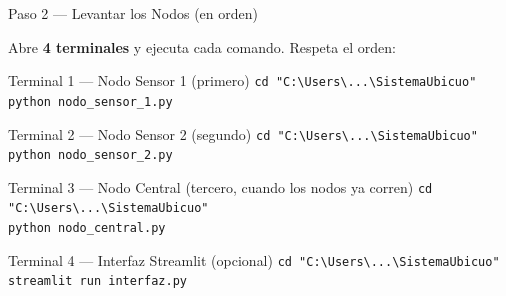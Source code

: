 \documentclass[aspectratio=169]{beamer}
\begin{document}
\begin{frame}{Paso 2 --- Levantar los Nodos (en orden)}

Abre \textbf{4 terminales} y ejecuta cada comando. Respeta el orden:

\vspace{0.3em}
\begin{exampleblock}{Terminal 1 --- Nodo Sensor 1 \quad (primero)}
\texttt{cd "C:\textbackslash{}Users\textbackslash{}...\textbackslash{}SistemaUbicuo"}\\
\texttt{python nodo\_sensor\_1.py}
\end{exampleblock}

\begin{exampleblock}{Terminal 2 --- Nodo Sensor 2 \quad (segundo)}
\texttt{cd "C:\textbackslash{}Users\textbackslash{}...\textbackslash{}SistemaUbicuo"}\\
\texttt{python nodo\_sensor\_2.py}
\end{exampleblock}

\begin{block}{Terminal 3 --- Nodo Central \quad (tercero, cuando los nodos ya corren)}
\texttt{cd "C:\textbackslash{}Users\textbackslash{}...\textbackslash{}SistemaUbicuo"}\\
\texttt{python nodo\_central.py}
\end{block}

\begin{block}{Terminal 4 --- Interfaz Streamlit \quad (opcional)}
\texttt{cd "C:\textbackslash{}Users\textbackslash{}...\textbackslash{}SistemaUbicuo"}\\
\texttt{streamlit run interfaz.py}
\end{block}
\end{frame}
\end{document}
